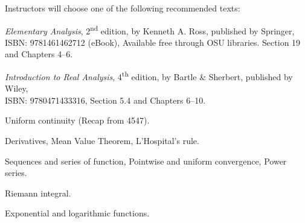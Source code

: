 \documentclass{osucourse}
\begin{document}
\CatalogDescription
\PrerequisitesAndExclusions

\begin{Text}
Instructors will choose one of the following recommended texts:

\emph{Elementary Analysis}, 2\textsuperscript{nd} edition, by Kenneth A.
Ross, published by Springer, ISBN: 9781461462712 (eBook), Available
free through OSU libraries. Section 19 and Chapters 4--6.

\emph{Introduction to Real Analysis}, 4\textsuperscript{th} edition, by
Bartle \& Sherbert, published by Wiley,\\
ISBN: 9780471433316, Section 5.4 and Chapters 6--10.
\end{Text}

\begin{TopicsList}
\item
  Uniform continuity (Recap from 4547).
\item
  Derivatives, Mean Value Theorem, L'Hospital's rule.
\item
  Sequences and series of function, Pointwise and uniform convergence,
  Power series.
\item
  Riemann integral.
\item
  Exponential and logarithmic functions.
\end{TopicsList}

\begin{SuggestedSchedule}
\end{SuggestedSchedule}
\end{document}
